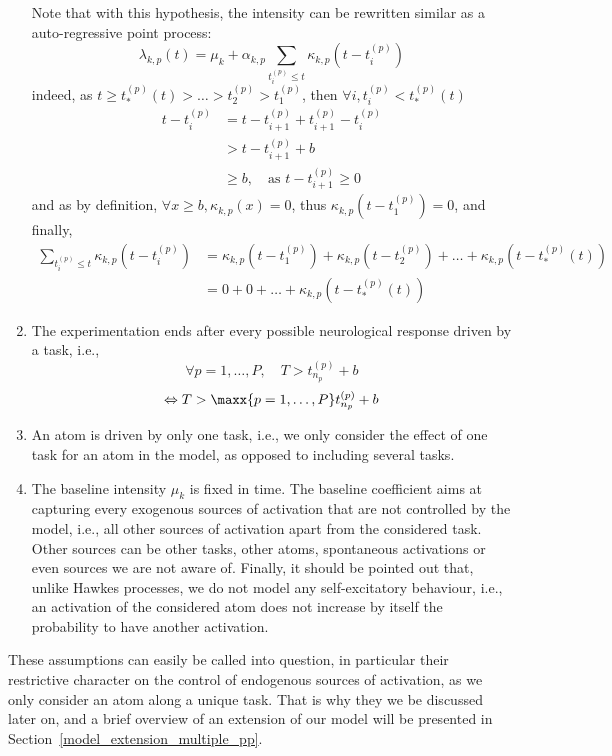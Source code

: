 \begin{enumerate}
    Note that with this hypothesis, the intensity can be rewritten similar as a auto-regressive point process:
    \begin{equation}
        \lambda_{k,p}(t)  = \mu_k + \alpha_{k,p}\sum_{t_i^{(p)} \leq t} \kappa_{k,p}(t - t_i^{(p)})
    \end{equation}
    indeed, as $t \geq t_*^{(p)}(t) > \dots > t_2^{(p)} > t_1^{(p)}$, then $\forall i, t_i^{(p)} < t_*^{(p)}(t)$
    \begin{align*}
        t - t_i^{(p)} &= t - t_{i+1}^{(p)} + t_{i+1}^{(p)} - t_i^{(p)} \\
        &> t - t_{i+1}^{(p)} + b \\
        &\geq b, \quad \text{as } t - t_{i+1}^{(p)}\geq 0
    \end{align*}
    and as by definition, $\forall x \geq b, \kappa_{k,p}(x)=0$, thus $\kappa_{k,p}(t - t_1^{(p)}) = 0$, and finally,
    \begin{align*}
        \sum_{t_i^{(p)} \leq t} \kappa_{k,p}(t - t_i^{(p)}) &= \kappa_{k,p}(t - t_1^{(p)}) + \kappa_{k,p}(t - t_2^{(p)}) + \dots + \kappa_{k,p}(t - t_*^{(p)}(t)) \\
        &= 0 + 0 + \dots + \kappa_{k,p}(t - t_*^{(p)}(t))
    \end{align*}
    
    \item The experimentation ends after every possible neurological response driven by a task, i.e.,
    \begin{equation}\label{eq:long_duration}
        \forall p=1,\dots,P, \quad T > t_{n_p}^{(p)} + b
    \end{equation}
    $$
    \Leftrightarrow T > \maxx{p=1,\dots,P} t_{n_p}^{(p)} + b
    $$
    \item An atom is driven by only one task, i.e., we only consider the effect of one task for an atom in the model, as opposed to including several tasks.
    
    \item The baseline intensity $\mu_k$ is fixed in time.
    The baseline coefficient aims at capturing every exogenous sources of activation that are not controlled by the model, i.e., all other sources of activation apart from the considered task.
    Other sources can be other tasks, other atoms, spontaneous activations or even sources we are not aware of.
    Finally, it should be pointed out that, unlike Hawkes processes, we do not model any self-excitatory behaviour, i.e., an activation of the considered atom does not increase by itself the probability to have another activation.
\end{enumerate}

These assumptions can easily be called into question, in particular their restrictive character on the control of endogenous sources of activation, as we only consider an atom along a unique task.
That is why they we be discussed later on, and a brief overview of an extension of our model will be presented in Section~\ref{model_extension_multiple_pp}.
